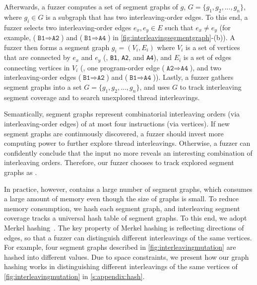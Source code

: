 Afterwards, a fuzzer computes a set of segment graphs of $g$,
$G = \{g_1, g_2, ..., g_n\}$, where $g_i \in G$ is a subgraph that has
two interleaving-order edges.
%
To this end, a fuzzer selects two interleaving-order edges
$e_x, e_y \in E$ such that $e_x \neq e_y$ (for example,
($\texttt{B1} \Rightarrow \texttt{A2}$) and
($\texttt{B1} \Rightarrow \texttt{A4}$) in
\autoref{fig:interleavingsegmentgraph}-(b)).
%
A fuzzer then forms a segment graph $g_i = (V_i, E_i)$ where $V_i$ is
a set of vertices that are connected by $e_x$ and $e_y$ (\ie,
\texttt{B1}, \texttt{A2}, and \texttt{A4}), and $E_i$ is a set of
edges connecting vertices in $V_i$ (\ie, one program-order edge
($\texttt{A2} \Rightarrow \texttt{A4}$), and two interleaving-order
edges ($\texttt{B1} \Rightarrow \texttt{A2}$) and
($\texttt{B1} \Rightarrow \texttt{A4}$)).
%
Lastly, a fuzzer gathers segment graphs into a set
$G = \{g_1, g_2, ..., g_n\}$, and uses $G$ to track interleaving
segment coverage and to search unexplored thread interleavings.





%
%
Semantically, segment graphs represent combinatorial interleaving
orders (via interleaving-order edges) of at most four instructions
(via vertices).
%
If new segment graphs are continuously discovered, a fuzzer should
invest more computing power to further explore thread interleavings.
Otherwise, a fuzzer can confidently conclude that the input no more
reveals an interesting combination of interleaving orders.
%
Therefore, our fuzzer chooses to track explored segment graphs as
\intcov.


In practice, however, \intcov contains a large number of segment
graphs, which consumes a large amount of memory even though the size
of graphs is small.
%
To reduce memory consumption, we hash each segment graph, and
interleaving segment coverage tracks a universal hash table of segment
graphs.
%
To this end, we adopt Merkel hashing~\cite{treehashing, treehashing2}.
%
The key property of Merkel hashing is reflecting directions of edges,
so that a fuzzer can distinguish different interleavings of the same
vertices. For example, four segment graphs described in
\autoref{fig:interleavingmutation} are hashed into different values.
%
Due to space constraints, we present how our graph hashing works in
distinguishing different interleavings of the same vertices of
\autoref{fig:interleavingmutation} in \autoref{s:appendix:hash}.








